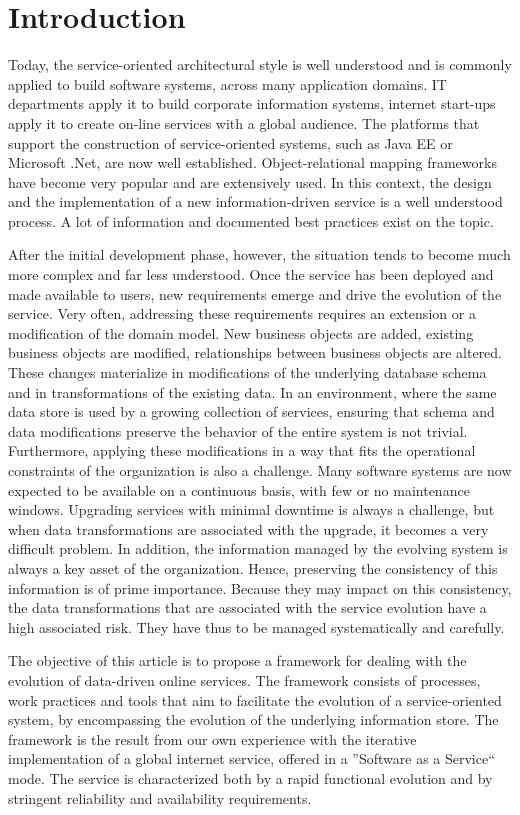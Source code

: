 \section{Introduction}

Today, the service-oriented architectural style is well understood and is commonly applied to build software systems, across many application domains. IT departments apply it to build corporate information systems, internet start-ups apply it to create on-line services with a global audience. The platforms that support the construction of service-oriented systems, such as Java EE or Microsoft .Net, are now well established. Object-relational mapping frameworks have become very popular and are extensively used. In this context, the design and the implementation of a new information-driven service is a well understood process. A lot of information and documented best practices exist on the topic.

After the initial development phase, however, the situation tends to become much more complex and far less understood. Once the service has been deployed and made available to users, new requirements emerge and drive the evolution of the service. Very often, addressing these requirements requires an extension or a modification of the domain model. New business objects are added, existing business objects are modified, relationships between business objects are altered. These changes materialize in modifications of the underlying database schema and in transformations of the existing data. In an environment, where the same data store is used by a growing collection of services, ensuring that schema and data modifications preserve the behavior of the entire system is not trivial. Furthermore, applying these modifications in a way that fits the operational constraints of the organization is also a challenge. Many software systems are now expected to be available on a continuous basis, with few or no maintenance windows. Upgrading services with minimal downtime is always a challenge, but when data transformations are associated with the upgrade, it becomes a very difficult problem. In addition, the information managed by the evolving system is always a key asset of the organization. Hence, preserving the consistency of this information is of prime importance. Because they may impact on this consistency, the data transformations that are associated with the service evolution have a high associated risk. They have thus to be managed systematically and carefully.

The objective of this article is to propose a framework for dealing with the evolution of data-driven online services. The framework consists of processes, work practices and tools that aim to facilitate the evolution of a service-oriented system, by encompassing the evolution of the underlying information store. The framework is the result from our own experience with the iterative implementation of a global internet service, offered in a ''Software as a Service`` mode. The service is characterized both by a rapid functional evolution and by stringent reliability and availability requirements. 

